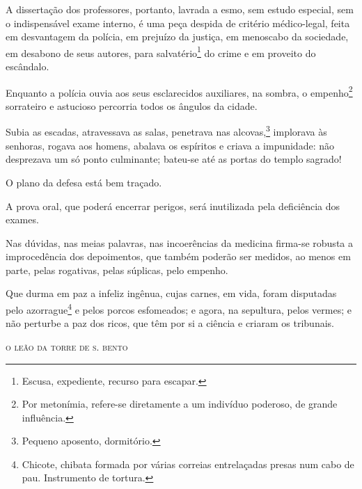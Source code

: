 {A dissertação dos professores, portanto, lavrada a esmo, sem estudo
especial, sem o indispensável exame interno, é uma peça despida de
critério médico-legal, feita em desvantagem da polícia, em prejuízo da
justiça, em menoscabo da sociedade, em desabono de seus autores, para
salvatério\footnote{Escusa, expediente, recurso para escapar.} do
crime e em proveito do escândalo.

\noindent\dotfill

Enquanto a polícia ouvia aos seus esclarecidos auxiliares, na sombra, o
empenho\footnote{Por metonímia, refere-se diretamente a um indivíduo
  poderoso, de grande influência.} sorrateiro e astucioso percorria
todos os ângulos da cidade.

Subia as escadas, atravessava as salas, penetrava nas alcovas,\footnote{
  Pequeno aposento, dormitório.} implorava às senhoras, rogava aos
homens, abalava os espíritos e criava a impunidade: não desprezava um só
ponto culminante; bateu-se até as portas do templo sagrado!

O plano da defesa está bem traçado.

A prova oral, que poderá encerrar perigos, será inutilizada pela
deficiência dos exames.

Nas dúvidas, nas meias palavras, nas incoerências da medicina firma-se
robusta a improcedência dos depoimentos, que também poderão ser medidos,
ao menos em parte, pelas rogativas, pelas súplicas, pelo empenho.

\noindent\dotfill

Que durma em paz a infeliz ingênua, cujas carnes, em vida, foram
disputadas pelo azorrague\footnote{Chicote, chibata formada por várias
  correias entrelaçadas presas num cabo de pau. Instrumento de tortura.}
e pelos porcos esfomeados;
e agora, na sepultura, pelos vermes; e não perturbe a paz dos ricos, que
têm por si a ciência e criaram os tribunais.

\medskip
\hfill\textsc{o leão da torre de s. bento}


}
